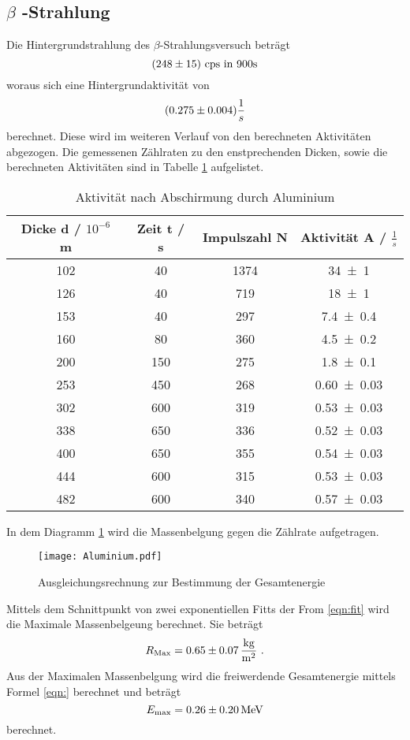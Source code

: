 \subsection{\texorpdfstring{$\beta$ -Strahlung }%
                               {beta -Strahlung}}
Die Hintergrundstrahlung des $\beta$-Strahlungsversuch beträgt
\begin{equation}
  (\num{248 +- 15}) \text{ cps in } 900 \text{s}
  \label{eqn:hintb}
\end{equation}
woraus sich eine Hintergrundaktivität von
\begin{equation}
  (\num{0.275 +- 0.004}) \frac{1}{s}
  \label{eqn:HAB}
\end{equation}
berechnet. Diese wird im weiteren Verlauf von den berechneten Aktivitäten abgezogen. Die gemessenen Zählraten zu den enstprechenden Dicken, sowie die berechneten Aktivitäten sind in Tabelle \ref{tab:AAlu} aufgelistet.
\begin{table}
  \centering
  \begin{tabular}{c c c c}
    \toprule
    Dicke d / $10^{-6}$ m & Zeit t / s & Impulszahl N & Aktivität A / $\frac{1}{s}$ \\
    \midrule
    102&	40 &	1374&	\num{34 +-1 } \\
    126&	40 &	719&	\num{18 +-1 } \\
    153&	40 &	297&	\num{7.4 +- 0.4 } \\
    160&	80 &	360&	\num{4.5 +- 0.2 } \\
    200&	150&	275&	\num{1.8 +- 0.1 } \\
    253&	450&	268&	\num{0.60 +-0.03 } \\
    302&	600&	319&	\num{0.53 +-0.03 } \\
    338&	650&	336&	\num{0.52 +-0.03 } \\
    400&	650&	355&	\num{0.54 +-0.03 } \\
    444&	600&	315&	\num{0.53 +-0.03} \\
    482&	600&	340&	\num{0.57 +-0.03 } \\
    \bottomrule
  \end{tabular}
  \caption{Aktivität nach Abschirmung durch Aluminium}
  \label{tab:AAlu}
\end{table}
In dem Diagramm \ref{fig:Alu} wird die Massenbelgung gegen die Zählrate aufgetragen.
\begin{figure}
  \centering
  \texttt{[image: Aluminium.pdf]}
  \caption{Ausgleichungsrechnung zur Bestimmung der Gesamtenergie}
  \label{fig:Alu}
\end{figure}
Mittels dem Schnittpunkt von zwei exponentiellen Fitts der From \eqref{eqn:fit} wird die Maximale Massenbelgeung berechnet. Sie beträgt
\begin{equation}
  R_\text{Max} = \num{0.65 +- 0.07} \, \frac{\text{kg}}{\text{m}^2} \ .
  \label{eqn:Rmax}
\end{equation}
Aus der Maximalen Massenbelgung wird die freiwerdende Gesamtenergie mittels Formel \eqref{eqn:} berechnet und beträgt
\begin{equation}
  E_\text{max} = \num{0.26 +- 0.2} \, \text{MeV}
  \label{eqn:max}
\end{equation}
berechnet.
